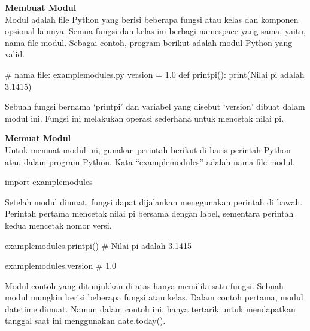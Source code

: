 \documentclass[
  letterpaper,
  DIV=11,
  numbers=noendperiod]{scrreprt}
\newenvironment{Shaded}{\begin{snugshade}}{\end{snugshade}}
\newcommand{\BuiltInTok}[1]{\textcolor[rgb]{0.00,0.23,0.31}{#1}}
\newcommand{\CommentTok}[1]{\textcolor[rgb]{0.37,0.37,0.37}{#1}}
\newcommand{\ImportTok}[1]{\textcolor[rgb]{0.00,0.46,0.62}{#1}}
\newcommand{\KeywordTok}[1]{\textcolor[rgb]{0.00,0.23,0.31}{#1}}
\newcommand{\NormalTok}[1]{\textcolor[rgb]{0.00,0.23,0.31}{#1}}
\newcommand{\OperatorTok}[1]{\textcolor[rgb]{0.37,0.37,0.37}{#1}}
\newcommand{\StringTok}[1]{\textcolor[rgb]{0.13,0.47,0.30}{#1}}
\begin{document}
\textbf{Membuat Modul}\\
Modul adalah file Python yang berisi beberapa fungsi atau kelas dan
komponen opsional lainnya. Semua fungsi dan kelas ini berbagi namespace
yang sama, yaitu, nama file modul. Sebagai contoh, program berikut
adalah modul Python yang valid.

\begin{Shaded}
\begin{Highlighting}[]
\CommentTok{\# nama file: examplemodules.py}
\NormalTok{version }\OperatorTok{=} \StringTok{\textquotesingle{}1.0\textquotesingle{}}
\KeywordTok{def}\NormalTok{ printpi():}
    \BuiltInTok{print}\NormalTok{(}\StringTok{\textquotesingle{}Nilai pi adalah 3.1415\textquotesingle{}}\NormalTok{)}
\end{Highlighting}
\end{Shaded}

Sebuah fungsi bernama `printpi' dan variabel yang disebut `version'
dibuat dalam modul ini. Fungsi ini melakukan operasi sederhana untuk
mencetak nilai pi.

\textbf{Memuat Modul}\\
Untuk memuat modul ini, gunakan perintah berikut di baris perintah
Python atau dalam program Python. Kata ``examplemodules'' adalah nama
file modul.

\begin{Shaded}
\begin{Highlighting}[]
\ImportTok{import}\NormalTok{ examplemodules}
\end{Highlighting}
\end{Shaded}

Setelah modul dimuat, fungsi dapat dijalankan menggunakan perintah di
bawah. Perintah pertama mencetak nilai pi bersama dengan label,
sementara perintah kedua mencetak nomor versi.

\begin{Shaded}
\begin{Highlighting}[]
\NormalTok{examplemodules.printpi()}
\CommentTok{\# Nilai pi adalah 3.1415}

\NormalTok{examplemodules.version}
\CommentTok{\# 1.0}
\end{Highlighting}
\end{Shaded}

Modul contoh yang ditunjukkan di atas hanya memiliki satu fungsi. Sebuah
modul mungkin berisi beberapa fungsi atau kelas. Dalam contoh pertama,
modul datetime dimuat. Namun dalam contoh ini, hanya tertarik untuk
mendapatkan tanggal saat ini menggunakan date.today().
\end{document}
